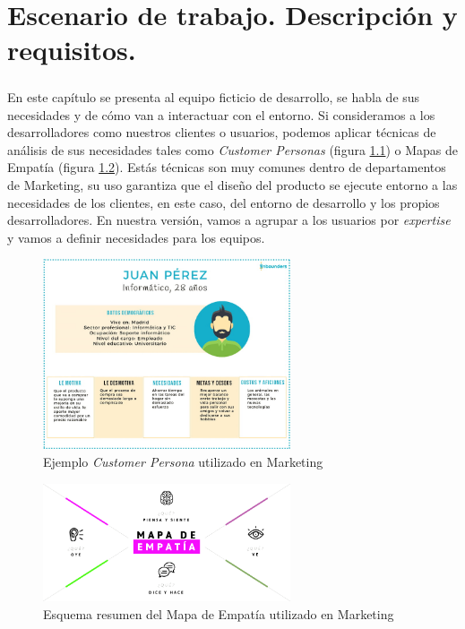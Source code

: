 \chapter{Escenario de trabajo. Descripción y requisitos.}\label{sec:EscenarioTrabajo}

\paragraph{}En este capítulo se presenta al equipo ficticio de desarrollo, se habla
de sus necesidades y de cómo van a interactuar con el entorno. Si consideramos a los
desarrolladores como nuestros clientes o usuarios, podemos aplicar técnicas de análisis
de sus necesidades tales como \textit{Customer Personas} (figura \ref{fig:customer_persona})
o Mapas de Empatía (figura \ref{fig:mapa_empatia}). Estás técnicas son muy comunes
dentro de departamentos de Marketing, su uso garantiza que el diseño del producto se
ejecute entorno a las necesidades de los clientes, en este caso, del entorno de desarrollo
y los propios desarrolladores. En nuestra versión, vamos a agrupar a los usuarios por
\textit{expertise} y vamos a definir necesidades para los equipos.

\begin{figure}[ht]
    \centering
    \includegraphics[width=0.65\textwidth]{imgs/buyer-persona-ejemplo.jpg}
    \caption{Ejemplo \textit{Customer Persona} utilizado en Marketing}
    \label{fig:customer_persona}
\end{figure}

\begin{figure}[H]
    \centering
    \includegraphics[width=0.65\textwidth]{imgs/mapa-empatia.png}
    \caption{Esquema resumen del Mapa de Empatía utilizado en Marketing}
    \label{fig:mapa_empatia}
\end{figure}

